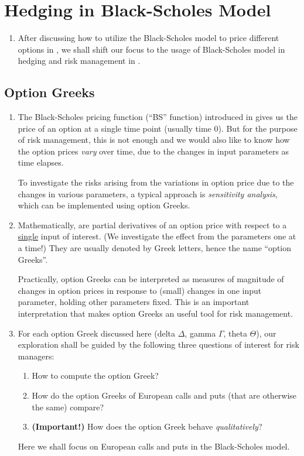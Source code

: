 \section{Hedging in Black-Scholes Model}
\label{sect:bs-model-hedging}
\begin{enumerate}
\item After discussing how to utilize the Black-Scholes model to price
different options in , we shall shift our focus to
the usage of Black-Scholes model in hedging and risk management in
.
\end{enumerate}
\subsection{Option Greeks}
\begin{enumerate}
\item The Black-Scholes pricing function (``BS'' function) introduced in
 gives us the price of an option at a single time
point (usually time 0). But for the purpose of risk management, this is not
enough and we would also like to know how the option prices \emph{vary} over
time, due to the changes in input parameters as time elapses.

To investigate the risks arising from the variations in option price due to the
changes in various parameters, a typical approach is \emph{sensitivity
analysis}, which can be implemented using option Greeks.

\item Mathematically,  are partial derivatives of an option
price with respect to a \underline{single} input of interest. (We investigate
the effect from the parameters one at a time!) They are usually denoted by
Greek letters, hence the name ``option Greeks''.

Practically, option Greeks can be interpreted as measures of magnitude of
changes in option prices in response to (small) changes in one input parameter,
holding other parameters fixed. This is an important interpretation that makes
option Greeks an useful tool for risk management.

\item For each option Greek discussed here (delta \(\Delta\), gamma \(\Gamma\),
theta \(\Theta\)), our exploration shall be guided by the following three
questions of interest for risk managers:
\begin{enumerate}[label={Q\arabic*}]
\item\label{it:cpt-greek} How to compute the option Greek?
\item \label{it:call-put-greek} How do the option Greeks of European calls and puts (that are otherwise
the same) compare?
\item\label{it:greek-qual} \textbf{(Important!)} How does the option Greek behave \emph{qualitatively}?
\end{enumerate}
Here we shall focus on European calls and puts in the Black-Scholes model.
\end{enumerate}
